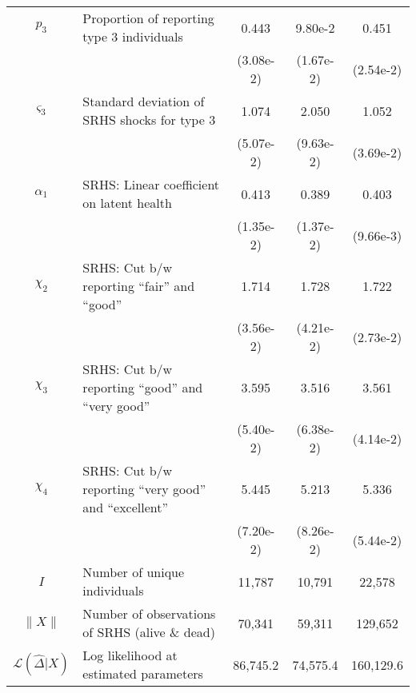 \begin{table}
\begin{center}
{\begin{tabular}{clccc}
\rule{0pt}{2.2ex}$p_3$ & Proportion of reporting type 3 individuals & 0.443 & 9.80e-2 & 0.451 \\
\rule{0pt}{2.2ex} & & (3.08e-2) & (1.67e-2) & (2.54e-2) \\
\rule{0pt}{2.2ex}$\varsigma_3$ & Standard deviation of SRHS shocks for type 3 & 1.074 & 2.050 & 1.052 \\
\rule{0pt}{2.2ex} & & (5.07e-2) & (9.63e-2) & (3.69e-2) \\
\hline
\rule{0pt}{2.2ex}$\alpha_1$ & SRHS: Linear coefficient on latent health & 0.413 & 0.389 & 0.403 \\
\rule{0pt}{2.2ex} & & (1.35e-2) & (1.37e-2) & (9.66e-3) \\
\rule{0pt}{2.2ex}$\chi_2$ & SRHS: Cut b/w reporting ``fair'' and ``good'' & 1.714 & 1.728 & 1.722 \\
\rule{0pt}{2.2ex} & & (3.56e-2) & (4.21e-2) & (2.73e-2) \\
\rule{0pt}{2.2ex}$\chi_3$ & SRHS: Cut b/w reporting ``good'' and ``very good'' & 3.595 & 3.516 & 3.561 \\
\rule{0pt}{2.2ex} & & (5.40e-2) & (6.38e-2) & (4.14e-2) \\
\rule{0pt}{2.2ex}$\chi_4$ & SRHS: Cut b/w reporting ``very good'' and ``excellent'' & 5.445 & 5.213 & 5.336 \\
\rule{0pt}{2.2ex} & & (7.20e-2) & (8.26e-2) & (5.44e-2) \\
\hline
\rule{0pt}{2.2ex}$I$ & Number of unique individuals & 11,787 & 10,791 & 22,578\\
\rule{0pt}{2.2ex}$\lVert X \rVert$ & Number of observations of SRHS (alive \& dead) & 70,341 & 59,311 & 129,652\\
\rule{0pt}{2.2ex}$\mathcal{L}(\widehat{\Delta} | X)$ & Log likelihood at estimated parameters & 86,745.2 & 74,575.4 & 160,129.6\\
\hline\hline
\end{tabular}
 } 
\usebox{\PSIDonlyTableBox} 
\end{center}
\end{table}
